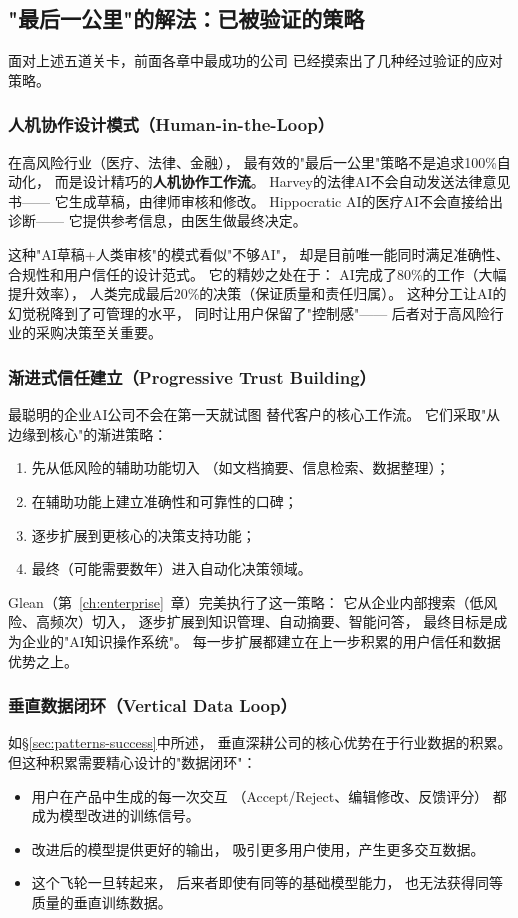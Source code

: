 \subsection{"最后一公里"的解法：已被验证的策略}

面对上述五道关卡，前面各章中最成功的公司
已经摸索出了几种经过验证的应对策略。

\subsubsection{人机协作设计模式（Human-in-the-Loop）}
在高风险行业（医疗、法律、金融），
最有效的"最后一公里"策略不是追求100\%自动化，
而是设计精巧的\textbf{人机协作工作流}。
Harvey的法律AI不会自动发送法律意见书——
它生成草稿，由律师审核和修改。
Hippocratic AI的医疗AI不会直接给出诊断——
它提供参考信息，由医生做最终决定。

这种"AI草稿+人类审核"的模式看似"不够AI"，
却是目前唯一能同时满足准确性、合规性和用户信任的设计范式。
它的精妙之处在于：
AI完成了80\%的工作（大幅提升效率），
人类完成最后20\%的决策（保证质量和责任归属）。
这种分工让AI的幻觉税降到了可管理的水平，
同时让用户保留了"控制感"——
后者对于高风险行业的采购决策至关重要。

\subsubsection{渐进式信任建立（Progressive Trust Building）}
最聪明的企业AI公司不会在第一天就试图
替代客户的核心工作流。
它们采取"从边缘到核心"的渐进策略：
\begin{enumerate}
  \item 先从低风险的辅助功能切入
    （如文档摘要、信息检索、数据整理）；
  \item 在辅助功能上建立准确性和可靠性的口碑；
  \item 逐步扩展到更核心的决策支持功能；
  \item 最终（可能需要数年）进入自动化决策领域。
\end{enumerate}

Glean（第~\ref{ch:enterprise}~章）完美执行了这一策略：
它从企业内部搜索（低风险、高频次）切入，
逐步扩展到知识管理、自动摘要、智能问答，
最终目标是成为企业的"AI知识操作系统"。
每一步扩展都建立在上一步积累的用户信任和数据优势之上。

\subsubsection{垂直数据闭环（Vertical Data Loop）}
如\S\ref{sec:patterns-success}中所述，
垂直深耕公司的核心优势在于行业数据的积累。
但这种积累需要精心设计的"数据闭环"：
\begin{itemize}
  \item 用户在产品中生成的每一次交互
    （Accept/Reject、编辑修改、反馈评分）
    都成为模型改进的训练信号。
  \item 改进后的模型提供更好的输出，
    吸引更多用户使用，产生更多交互数据。
  \item 这个飞轮一旦转起来，
    后来者即使有同等的基础模型能力，
    也无法获得同等质量的垂直训练数据。
\end{itemize}

